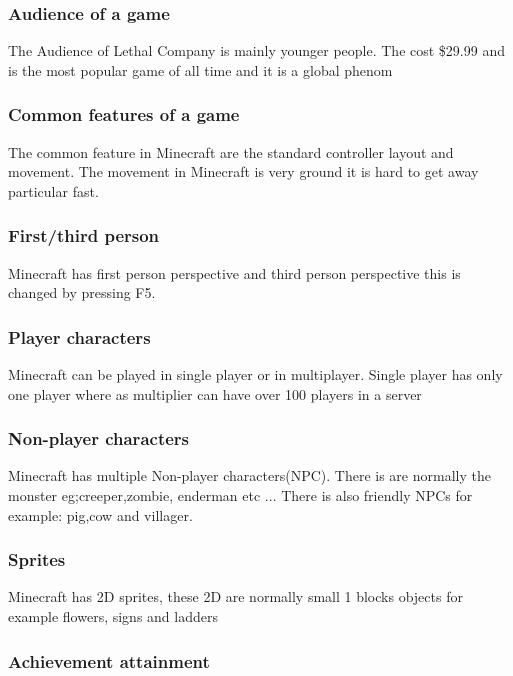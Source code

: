 \documentclass{article}
\begin{document}
\subsubsection{Audience of a game}

The Audience of Lethal Company is mainly younger people. The cost \$29.99 and is the most popular game of all time and it is a global phenom

\subsubsection{Common features of a game}

The common feature in Minecraft are the standard controller layout and movement. The movement in Minecraft is very ground it is hard to get away particular fast.

\subsubsection{First/third person}

Minecraft has first person perspective and third person perspective this is changed by pressing F5. 

\subsubsection{Player characters}

Minecraft can be played in single player or in multiplayer. Single player has only one player where as multiplier can have over 100 players in a server 

\subsubsection{Non-player characters}

Minecraft has multiple Non-player characters(NPC). There is are normally the monster eg;creeper,zombie, enderman etc ... There is also friendly NPCs for example: pig,cow and villager.

\subsubsection{Sprites}

Minecraft has 2D sprites, these 2D are normally small 1 blocks objects for example flowers, signs and ladders

\subsubsection{Achievement attainment}
\end{document}
